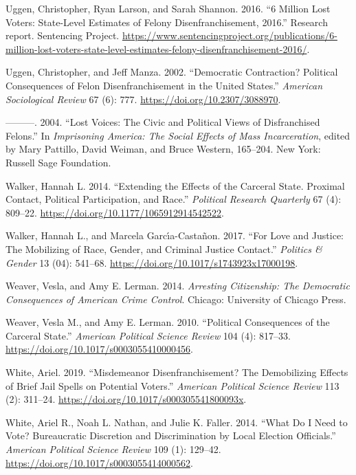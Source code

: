\documentclass[12pt,]{article}
\begin{document}
\leavevmode\hypertarget{ref-sentencing_2016}{}%
Uggen, Christopher, Ryan Larson, and Sarah Shannon. 2016. ``6 Million Lost Voters: State-Level Estimates of Felony Disenfranchisement, 2016.'' Research report. Sentencing Project. \url{https://www.sentencingproject.org/publications/6-million-lost-voters-state-level-estimates-felony-disenfranchisement-2016/}.

\leavevmode\hypertarget{ref-Uggen2002}{}%
Uggen, Christopher, and Jeff Manza. 2002. ``Democratic Contraction? Political Consequences of Felon Disenfranchisement in the United States.'' \emph{American Sociological Review} 67 (6): 777. \url{https://doi.org/10.2307/3088970}.

\leavevmode\hypertarget{ref-Uggen2004}{}%
---------. 2004. ``Lost Voices: The Civic and Political Views of Disfranchised Felons.'' In \emph{Imprisoning America: The Social Effects of Mass Incarceration}, edited by Mary Pattillo, David Weiman, and Bruce Western, 165--204. New York: Russell Sage Foundation.

\leavevmode\hypertarget{ref-Walker2014}{}%
Walker, Hannah L. 2014. ``Extending the Effects of the Carceral State. Proximal Contact, Political Participation, and Race.'' \emph{Political Research Quarterly} 67 (4): 809--22. \url{https://doi.org/10.1177/1065912914542522}.

\leavevmode\hypertarget{ref-Walker2017}{}%
Walker, Hannah L., and Marcela Garcı́a-Castañon. 2017. ``For Love and Justice: The Mobilizing of Race, Gender, and Criminal Justice Contact.'' \emph{Politics \& Gender} 13 (04): 541--68. \url{https://doi.org/10.1017/s1743923x17000198}.

\leavevmode\hypertarget{ref-Weaver2014}{}%
Weaver, Vesla, and Amy E. Lerman. 2014. \emph{Arresting Citizenship: The Democratic Consequences of American Crime Control}. Chicago: University of Chicago Press.

\leavevmode\hypertarget{ref-Weaver2010}{}%
Weaver, Vesla M., and Amy E. Lerman. 2010. ``Political Consequences of the Carceral State.'' \emph{American Political Science Review} 104 (4): 817--33. \url{https://doi.org/10.1017/s0003055410000456}.

\leavevmode\hypertarget{ref-White2019}{}%
White, Ariel. 2019. ``Misdemeanor Disenfranchisement? The Demobilizing Effects of Brief Jail Spells on Potential Voters.'' \emph{American Political Science Review} 113 (2): 311--24. \url{https://doi.org/10.1017/s000305541800093x}.

\leavevmode\hypertarget{ref-WHITE2014}{}%
White, Ariel R., Noah L. Nathan, and Julie K. Faller. 2014. ``What Do I Need to Vote? Bureaucratic Discretion and Discrimination by Local Election Officials.'' \emph{American Political Science Review} 109 (1): 129--42. \url{https://doi.org/10.1017/s0003055414000562}.
\end{document}
